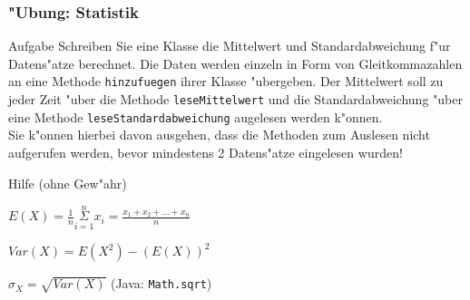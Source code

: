 \documentclass{beamer}
\begin{document}
\begin{frame}
\frametitle{"Ubung: Statistik}
\begin{block}{Aufgabe}
Schreiben Sie eine Klasse die Mittelwert und Standardabweichung f"ur Datens"atze berechnet. Die Daten werden einzeln in Form von Gleitkommazahlen an eine Methode \texttt{hinzufuegen} ihrer Klasse "ubergeben. Der Mittelwert soll zu jeder Zeit "uber die Methode \texttt{leseMittelwert} und die Standardabweichung "uber eine Methode \texttt{leseStandardabweichung} augelesen werden k"onnen.\\Sie k"onnen hierbei davon ausgehen, dass die Methoden zum Auslesen nicht aufgerufen werden, bevor mindestens 2 Datens"atze eingelesen wurden!
\end{block}

\begin{block}{Hilfe (ohne Gew"ahr)}
\begin{description}[Standardabweichung]
\item[Mittelwert] $E(X) = \frac{1}{n} \underset{i = 1}{\overset{n}{\Sigma}} x_i = \frac{x_1 + x_2 + ... + x_n}{n}$
\item[Varianz] $Var(X) = E(X^2) - (E(X))^2$
\item[Standardabweichung] $\sigma_X = \sqrt{Var(X)}$ \hspace{5em} (Java: \texttt{Math.sqrt})
\end{description}
\end{block}
\end{frame}
\end{document}
